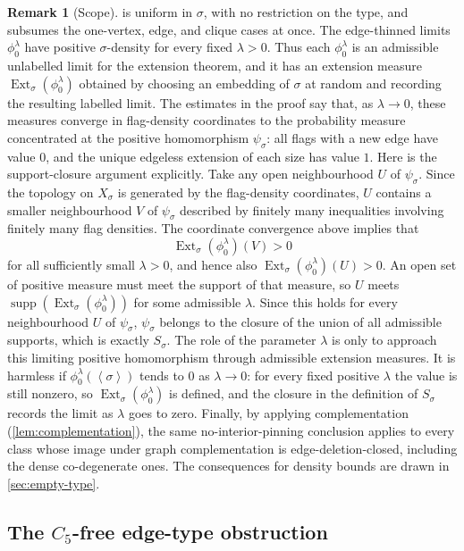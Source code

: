 \documentclass[11pt]{article}
\theoremstyle{definition}
\newtheorem{remark}[remark]{Remark}
\newcommand{\Ext}{\operatorname{Ext}}
\newcommand{\supp}{\operatorname{supp}}
\newcommand{\brak}[1]{\left\langle #1\right\rangle}
\begin{document}
\begin{remark}[Scope]
 is uniform in $\sigma$, with no restriction on the type, and
subsumes the one-vertex, edge, and clique cases at once.  The edge-thinned limits
$\phi_0^\lambda$ have positive $\sigma$-density for every fixed $\lambda>0$.  Thus each
$\phi_0^\lambda$ is an admissible unlabelled limit for the extension theorem, and it has
an extension measure $\Ext_\sigma(\phi_0^\lambda)$ obtained by choosing an embedding of
$\sigma$ at random and recording the resulting labelled limit.  The estimates in the proof
say that, as $\lambda\to0$, these measures converge in flag-density coordinates to the
probability measure concentrated at the positive homomorphism $\psi_\sigma$: all flags
with a new edge have value $0$, and the unique edgeless extension of each size has value
$1$.
Here is the support-closure argument explicitly.  Take any open neighbourhood $U$ of
$\psi_\sigma$.  Since the topology on $X_\sigma$ is generated by the flag-density
coordinates, $U$ contains a smaller neighbourhood $V$ of $\psi_\sigma$ described by
finitely many inequalities involving finitely many flag densities.  The coordinate
convergence above implies that
\[
  \Ext_\sigma(\phi_0^\lambda)(V)>0
\]
for all sufficiently small $\lambda>0$, and hence also
$\Ext_\sigma(\phi_0^\lambda)(U)>0$.  An open set of positive measure must meet the support
of that measure, so $U$ meets $\supp(\Ext_\sigma(\phi_0^\lambda))$ for some admissible
$\lambda$.  Since this holds for every neighbourhood $U$ of $\psi_\sigma$,
$\psi_\sigma$ belongs to the closure of the union of all admissible supports, which is
exactly $S_\sigma$.
The role of the parameter $\lambda$ is only to approach this limiting positive
homomorphism through admissible extension measures.  It is harmless if
$\phi_0^\lambda(\brak\sigma)$ tends to $0$ as $\lambda\to0$: for every fixed positive
$\lambda$ the value is still nonzero, so $\Ext_\sigma(\phi_0^\lambda)$ is defined, and the
closure in the definition of $S_\sigma$ records the limit as $\lambda$ goes to zero.
Finally, by applying complementation (\cref{lem:complementation}), the same
no-interior-pinning conclusion applies to every class whose image under graph
complementation is edge-deletion-closed, including the dense co-degenerate ones.  The
consequences for density bounds are drawn in \cref{sec:empty-type}.
\end{remark}

\subsection{The \texorpdfstring{$C_5$}{C5}-free edge-type obstruction}\label{sec:c5-edge}
\end{document}
